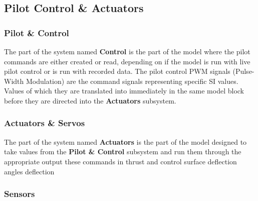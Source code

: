 \subsection{Pilot Control	 \& Actuators}

\subsubsection{Pilot \& Control}

The part of the system named \textbf{Control} is the part of the model where the pilot commands are either created or read, depending on if the model is run with live pilot control or is run with recorded data. The pilot control PWM signals (Pulse-Width Modulation) are the command signals representing specific SI values. Values of which they are translated into immediately in the same model block before they are directed into the \textbf{Actuators} subsystem.

\subsubsection{Actuators \& Servos}

The part of the system named \textbf{Actuators} is the part of the model designed to take values from the \textbf{Pilot \& Control} subsystem and run them through the appropriate  output these commands in thrust and control surface deflection angles deflection


\subsubsection{Sensors}

